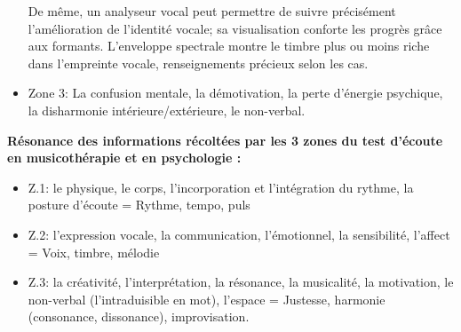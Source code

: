 \begin{itemize}
                            De même, un analyseur vocal peut permettre de suivre précisément l'amélioration de
                            l'identité vocale; sa visualisation conforte les progrès grâce aux
                            formants. L'enveloppe spectrale montre le timbre plus ou moins riche
                            dans l'empreinte vocale, renseignements précieux selon les cas.

                            	\item Zone 3: La confusion mentale, la démotivation, la perte d'énergie
                            psychique, la disharmonie intérieure/extérieure, le non-verbal.
                            \end{itemize}






                            	\textbf{Résonance des informations récoltées par les 3
                                      zones du test d'écoute en musicothérapie et en
                              psychologie :}

                            \begin{itemize}
                             \item  Z.1: le physique, le corps, l'incorporation et
                            l'intégration du rythme,
                            la posture d'écoute  =  Rythme, tempo, puls

                            \item  Z.2:  l'expression vocale, la communication,
                            l'émotionnel, la sensibilité, l'affect = Voix, timbre, mélodie

                            \item Z.3: la créativité, l'interprétation, la
                            résonance, la musicalité, la motivation, le non-verbal (l'intraduisible en mot), l'espace = Justesse, harmonie (consonance,
                            dissonance), improvisation.
                            \end{itemize}

